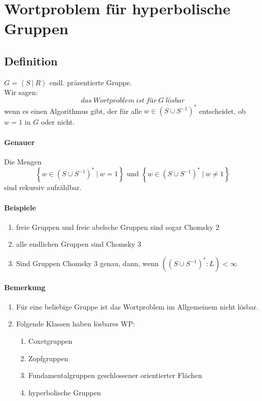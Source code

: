 \documentclass{article}
\newcommand{\set}[2]{\left\lbrace #1~|~#2 \right\rbrace}
\newcommand{\grp}[2]{\left\langle #1~|~#2 \right\rangle}
\begin{document}
\newpage
\section{Wortproblem für hyperbolische Gruppen}

\subsection{Definition}
$G = \grp{S}{R}$ endl. präsentierte Gruppe.\\
Wir sagen:
\[das~Wortproblem ~ist ~für ~G ~lösbar\]
wenn es einen Algorithmus gibt, der für alle $w \in (S\cup S^{-1})^*$ entscheidet, ob $w= 1$ in $G$ oder nicht.\\
\paragraph{Genauer} Die Mengen 
\[\set{w \in (S\cup S^{-1})^*}{w = 1} \text{ und } \set{w \in (S\cup S^{-1})^*}{w \neq 1}\]
sind rekursiv aufzählbar.

\paragraph{Beispiele}
\begin{enumerate}
	\item freie Gruppen und freie abelsche Gruppen sind sogar Chomsky 2
	\item alle endlichen Gruppen sind Chomsky 3
	\item Sind Gruppen Chomsky 3 genau, dann, wenn $((S\cup S^{-1})^* : L) < \infty$
\end{enumerate}

\paragraph{Bemerkung}
\begin{enumerate}
	\item Für eine beliebige Gruppe ist das Wortproblem im Allgemeinem nicht lösbar.
	\item Folgende Klassen haben lösbares WP:
	\begin{enumerate}
		\item Coxetgruppen
		\item Zopfgruppen
		\item Fundamentalgruppen geschlossener orientierter Flächen
		\item hyperbolische Gruppen
	\end{enumerate}
\end{enumerate}
\end{document}
